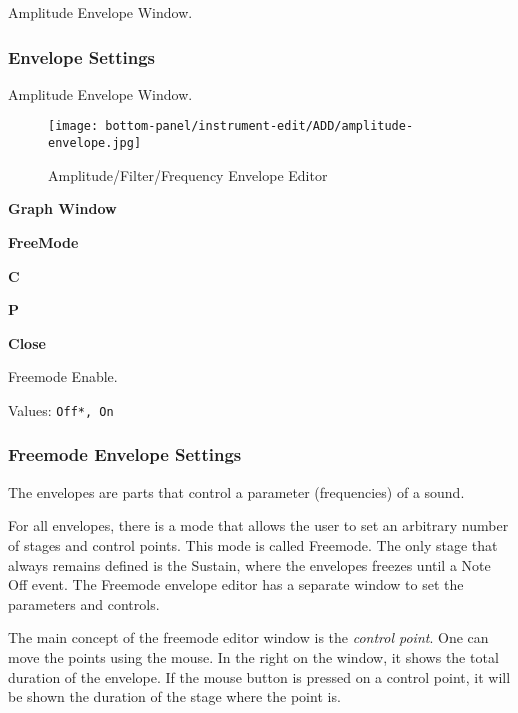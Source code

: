    Amplitude Envelope Window.

\subsubsection{Envelope Settings}
\label{subsubsec:envelope_settings}

   Amplitude Envelope Window.

\begin{figure}[H]
   \centering 
   \texttt{[image: bottom-panel/instrument-edit/ADD/amplitude-envelope.jpg]}
   \caption{Amplitude/Filter/Frequency Envelope Editor}
   \label{fig:amplitude_envelope_editor}
\end{figure}

   \begin{enumber}
      \item \textbf{Graph Window}
      \item \textbf{FreeMode}
      \item \textbf{C}
      \item \textbf{P}
      \item \textbf{Close}
   \end{enumber}

   Freemode Enable.

   Values: \texttt{Off*, On} \\

\subsubsection{Freemode Envelope Settings}
\label{subsubsec:freemode_envelope_settings}

   The envelopes are parts that control a parameter (frequencies) of a sound. 

   For all envelopes, there is a mode that allows the user to set an arbitrary
   number of stages and control points. This mode is called Freemode.
   The only stage that always remains defined is the Sustain, where the
   envelopes freezes until a Note Off event.
   The Freemode envelope editor has a separate window to set the parameters and
   controls.

   The main concept of the freemode editor window is the
   \textsl{control point}.
   One can move the points using the mouse. In the right on the
   window, it shows the total duration of the envelope. If the mouse button
   is pressed on a control point, it will be shown the duration of the
   stage where the point is.

